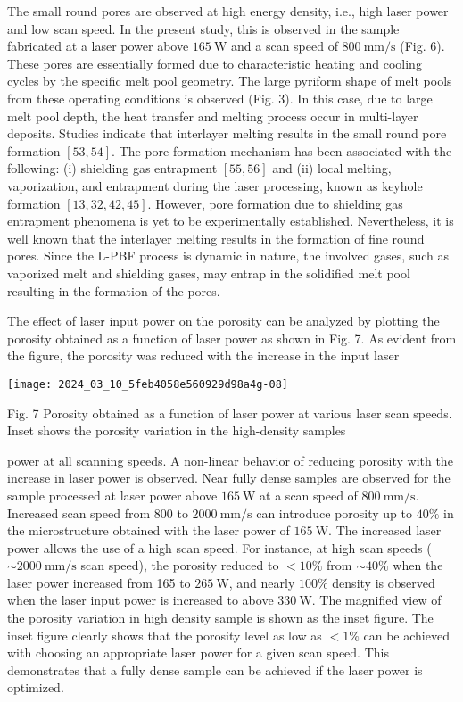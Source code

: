 \documentclass[10pt]{article}
\begin{document}
The small round pores are observed at high energy density, i.e., high laser power and low scan speed. In the present study, this is observed in the sample fabricated at a laser power above $165 \mathrm{~W}$ and a scan speed of $800 \mathrm{~mm} / \mathrm{s}$ (Fig. 6). These pores are essentially formed due to characteristic heating and cooling cycles by the specific melt pool geometry. The large pyriform shape of melt pools from these operating conditions is observed (Fig. 3). In this case, due to large melt pool depth, the heat transfer and melting process occur in multi-layer deposits. Studies indicate that interlayer melting results in the small round pore formation $[53,54]$. The pore formation mechanism has been associated with the following: (i) shielding gas entrapment $[55,56]$ and (ii) local melting, vaporization, and entrapment during the laser processing, known as keyhole formation $[13,32,42,45]$. However, pore formation due to shielding gas entrapment phenomena is yet to be experimentally established. Nevertheless, it is well known that the interlayer melting results in the formation of fine round pores. Since the L-PBF process is dynamic in nature, the involved gases, such as vaporized melt and shielding gases, may entrap in the solidified melt pool resulting in the formation of the pores.

The effect of laser input power on the porosity can be analyzed by plotting the porosity obtained as a function of laser power as shown in Fig. 7. As evident from the figure, the porosity was reduced with the increase in the input laser

\begin{center}
\texttt{[image: 2024\_03\_10\_5feb4058e560929d98a4g-08]}
\end{center}

Fig. 7 Porosity obtained as a function of laser power at various laser scan speeds. Inset shows the porosity variation in the high-density samples

power at all scanning speeds. A non-linear behavior of reducing porosity with the increase in laser power is observed. Near fully dense samples are observed for the sample processed at laser power above $165 \mathrm{~W}$ at a scan speed of $800 \mathrm{~mm} / \mathrm{s}$. Increased scan speed from 800 to $2000 \mathrm{~mm} / \mathrm{s}$ can introduce porosity up to $40 \%$ in the microstructure obtained with the laser power of $165 \mathrm{~W}$. The increased laser power allows the use of a high scan speed. For instance, at high scan speeds ( $\sim 2000 \mathrm{~mm} / \mathrm{s}$ scan speed), the porosity reduced to $<10 \%$ from $\sim 40 \%$ when the laser power increased from 165 to $265 \mathrm{~W}$, and nearly $100 \%$ density is observed when the laser input power is increased to above $330 \mathrm{~W}$. The magnified view of the porosity variation in high density sample is shown as the inset figure. The inset figure clearly shows that the porosity level as low as $<1 \%$ can be achieved with choosing an appropriate laser power for a given scan speed. This demonstrates that a fully dense sample can be achieved if the laser power is optimized.
\end{document}
